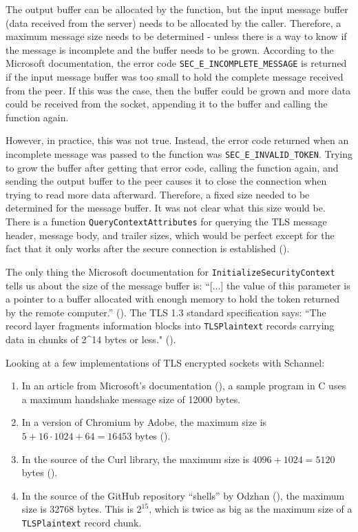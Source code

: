 \documentclass[12pt, a4paper]{article}
\begin{document}
The output buffer can be allocated by the function, but the input message buffer (data received from the server) needs to be allocated by the caller. Therefore, a maximum message size needs to be determined - unless there is a way to know if the message is incomplete and the buffer needs to be grown. According to the Microsoft documentation, the error code \texttt{SEC\_E\_INCOMPLETE\_MESSAGE} is returned if the input message buffer was too small to hold the complete message received from the peer. If this was the case, then the buffer could be grown and more data could be received from the socket, appending it to the buffer and calling the function again.

However, in practice, this was not true. Instead, the error code returned when an incomplete message was passed to the function was \texttt{SEC\_E\_INVALID\_TOKEN}. Trying to grow the buffer after getting that error code, calling the function again, and sending the output buffer to the peer causes it to close the connection when trying to read more data afterward. Therefore, a fixed size needed to be determined for the message buffer. It was not clear what this size would be. There is a function \texttt{QueryContextAttributes} for querying the TLS message header, message body, and trailer sizes, which would be perfect except for the fact that it only works after the secure connection is established (\cite{MicrosoftQueryContextAttributes}). 

The only thing the Microsoft documentation for \texttt{InitializeSecurityContext} tells us about the size of the message buffer is: “[...] the value of this parameter is a pointer to a buffer allocated with enough memory to hold the token returned by the remote computer.” (\cite{MicrosoftInitializeSecurityContext}). The TLS 1.3 standard specification says: “The record layer fragments information blocks into \texttt{TLSPlaintext} records carrying data in chunks of 2\^{}14 bytes or less." (\cite[][p. 78]{TlsSpec}). 

Looking at a few implementations of TLS encrypted sockets with Schannel:
\begin{enumerate}
	\item In an article from Microsoft’s documentation (\citeyear{SchannelUsageMicrosoft}), a sample program in C uses a maximum handshake message size of 12000 bytes.
	\item In a version of Chromium by Adobe, the maximum size is $5+16\cdot1024+64=16453$ bytes (\cite{SchannelUsageChromium}).
	\item In the source of the Curl library, the maximum size is $4096+1024=5120$ bytes (\cite{SchannelUsageLibcurl}).
	\item In the source of the GitHub repository “shells” by Odzhan (\citeyear{SchannelUsageOdzhanRepo}), the maximum size is 32768 bytes. This is $2^{15}$, which is twice as big as the maximum size of a \texttt{TLSPlaintext} record chunk.
\end{enumerate}
\end{document}
